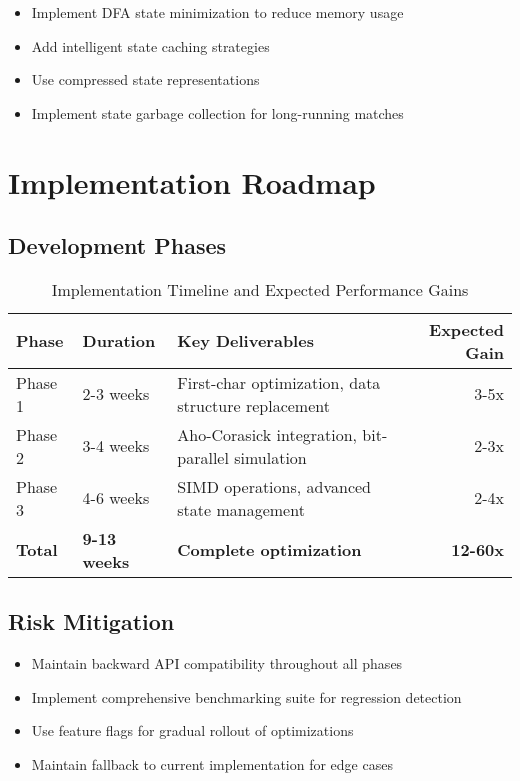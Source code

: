 \documentclass[11pt,a4paper]{article}
\begin{document}
\begin{itemize}
\item Implement DFA state minimization to reduce memory usage
\item Add intelligent state caching strategies
\item Use compressed state representations
\item Implement state garbage collection for long-running matches
\end{itemize}

\section{Implementation Roadmap}

\subsection{Development Phases}

\begin{table}[htbp]
\centering
\begin{tabular}{@{}lllr@{}}
\toprule
\textbf{Phase} & \textbf{Duration} & \textbf{Key Deliverables} & \textbf{Expected Gain} \\
\midrule
Phase 1 & 2-3 weeks & First-char optimization, data structure replacement & 3-5x \\
Phase 2 & 3-4 weeks & Aho-Corasick integration, bit-parallel simulation & 2-3x \\
Phase 3 & 4-6 weeks & SIMD operations, advanced state management & 2-4x \\
\midrule
\textbf{Total} & \textbf{9-13 weeks} & \textbf{Complete optimization} & \textbf{12-60x} \\
\bottomrule
\end{tabular}
\caption{Implementation Timeline and Expected Performance Gains}
\label{tab:roadmap}
\end{table}

\subsection{Risk Mitigation}

\begin{itemize}
\item Maintain backward API compatibility throughout all phases
\item Implement comprehensive benchmarking suite for regression detection
\item Use feature flags for gradual rollout of optimizations
\item Maintain fallback to current implementation for edge cases
\end{itemize}
\end{document}
